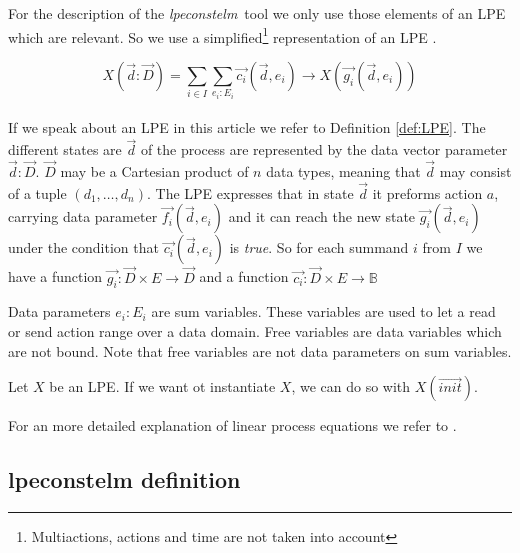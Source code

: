 \documentclass[a4paper,10pt]{article}
\newcommand{\lpe}{linear process equation}
\newcommand{\tool}{\textit{lpeconstelm}}
\newcommand{\ovr}{\overrightarrow}
\newcommand{\ti}{\textit}
\begin{document}
For the description of the \tool\ tool we only use those elements of an LPE which are relevant. So we use a simplified\footnote{Multiactions, actions and time are not taken into account} representation of an LPE .
\begin{defn}\label{def:LPE}
\begin{displaymath}
X (\ovr{d}:\ovr{D}) = \sum_{i \in I} \sum_{e_i:E_i} \ovr{c_i} ( \ovr{d}, e_i ) \rightarrow X(\ovr{g_i}(\ovr{d},e_i))
\end{displaymath}\\
If we speak about an LPE in this article we refer to Definition \ref{def:LPE}.  The different states are $\ovr{d}$ of the process are represented by the data vector parameter $\ovr{d}:\ovr{D}$. $\ovr{D}$ may be a Cartesian product of $n$ data types, meaning that $\ovr{d}$ may consist of a tuple $(d_1, \ldots, d_n)$. The LPE expresses that in state $\ovr{d}$ it preforms action $a$, carrying data parameter $\ovr{f_i}(\ovr{d},e_i)$ and it can reach the new state $\ovr{g_i}(\ovr{d},e_i)$ under the condition that $\ovr{c_i}(\ovr{d},e_i)$ is \ti{true}. So for each summand $i$ from $I$ we have a function $\ovr{g_i}: \ovr{D} \times E \rightarrow \ovr{D}$ and a function $\ovr{c_i}: \ovr{D} \times E \rightarrow \mathbb{B}$


Data parameters $e_i : E_i$ are sum variables. These variables are used to let a read or send action range over a data domain. Free variables are data variables which are not bound. Note that free variables are not data parameters on sum variables.

Let $X$ be an LPE. If we want ot instantiate $X$, we can do so with $X(\ovr{init})$. 

For an more detailed explanation of \lpe s  we refer to \cite{LPE_info}.
\end{defn}

\subsection{lpeconstelm definition}\label{subsec:lpedef}
\end{document}
